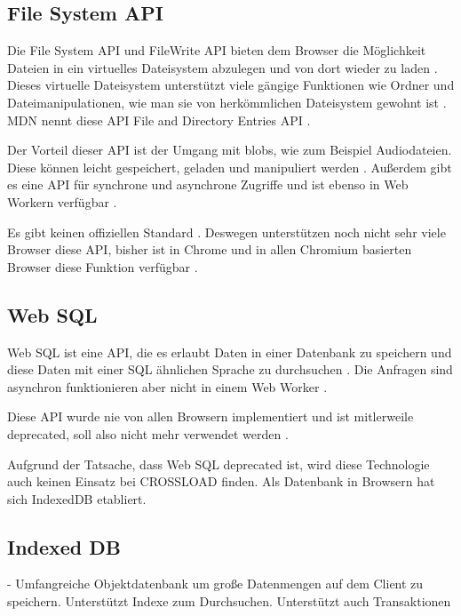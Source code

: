 \subsection{File System API}
Die File System \ac{API} und FileWrite \ac{API} bieten dem Browser die Möglichkeit Dateien in ein virtuelles Dateisystem abzulegen und von dort wieder zu laden \autocite{Hajian2019} \autocite{storage-for-the-web}. Dieses virtuelle Dateisystem unterstützt viele gängige Funktionen wie Ordner und Dateimanipulationen, wie man sie von herkömmlichen Dateisystem gewohnt ist \autocite{mdn-file-system}. MDN nennt diese \ac{API} File and Directory Entries \ac{API} \autocite{mdn-file-system}. 

Der Vorteil dieser \ac{API} ist der Umgang mit \acp{blob}, wie zum Beispiel Audiodateien. Diese können leicht gespeichert, geladen und manipuliert werden \autocite{mdn-file-system}. Außerdem gibt es eine \ac{API} für synchrone und asynchrone Zugriffe und ist ebenso in Web Workern verfügbar \autocite{Hajian2019}. 

Es gibt keinen offiziellen Standard \autocite{mdn-file-system} \autocite{caniuse-filesystem}. Deswegen unterstützen noch nicht sehr viele Browser diese \ac{API}, bisher ist in Chrome und in allen Chromium basierten Browser diese Funktion verfügbar \autocite{caniuse-filesystem}.

\subsection{Web SQL}
Web SQL ist eine \ac{API}, die es erlaubt Daten in einer Datenbank zu speichern und diese Daten mit einer SQL ähnlichen Sprache zu durchsuchen \autocite{w3-web-sql}. Die Anfragen sind asynchron funktionieren aber nicht in einem Web Worker \autocite{Hajian2019}.

Diese \ac{API} wurde nie von allen Browsern implementiert und ist mitlerweile deprecated, soll also nicht mehr verwendet werden \autocite{Hajian2019}.

Aufgrund der Tatsache, dass Web SQL deprecated ist, wird diese Technologie auch keinen Einsatz bei CROSSLOAD finden. Als Datenbank in Browsern hat sich IndexedDB etabliert.

\subsection{Indexed DB}
- Umfangreiche Objektdatenbank um große Datenmengen auf dem Client zu speichern. Unterstützt Indexe zum Durchsuchen. Unterstützt auch Transaktionen \autocite{Sheppard2017} 

